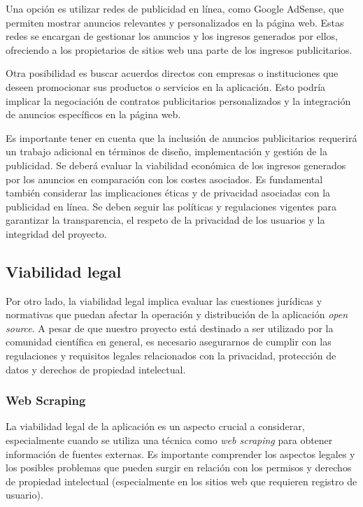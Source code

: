 Una opción es utilizar redes de publicidad en línea, como Google AdSense, que permiten mostrar anuncios relevantes y personalizados en la página web. Estas redes se encargan de gestionar los anuncios y los ingresos generados por ellos, ofreciendo a los propietarios de sitios web una parte de los ingresos publicitarios.

Otra posibilidad es buscar acuerdos directos con empresas o instituciones que deseen promocionar sus productos o servicios en la aplicación. Esto podría implicar la negociación de contratos publicitarios personalizados y la integración de anuncios específicos en la página web.

Es importante tener en cuenta que la inclusión de anuncios publicitarios requerirá un trabajo adicional en términos de diseño, implementación y gestión de la publicidad. Se deberá evaluar la viabilidad económica de los ingresos generados por los anuncios en comparación con los costes asociados. Es fundamental también considerar las implicaciones éticas y de privacidad asociadas con la publicidad en línea. Se deben seguir las políticas y regulaciones vigentes para garantizar la transparencia, el respeto de la privacidad de los usuarios y la integridad del proyecto.

\subsection{Viabilidad legal}
\label{sec:Viabilidad legal}
Por otro lado, la viabilidad legal implica evaluar las cuestiones jurídicas y normativas que puedan afectar la operación y distribución de la aplicación \textit{open source}. A pesar de que nuestro proyecto está destinado a ser utilizado por la comunidad científica en general, es necesario asegurarnos de cumplir con las regulaciones y requisitos legales relacionados con la privacidad, protección de datos y derechos de propiedad intelectual.

\subsubsection{Web Scraping}

La viabilidad legal de la aplicación es un aspecto crucial a considerar, especialmente cuando se utiliza una técnica como \textit{web scraping} para obtener información de fuentes externas. Es importante comprender los aspectos legales y los posibles problemas que pueden surgir en relación con los permisos y derechos de propiedad intelectual (especialmente en los sitios web que requieren registro de usuario).

